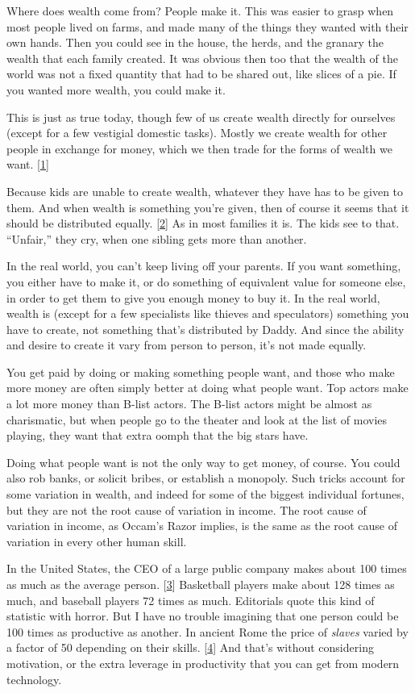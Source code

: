 Where does wealth come from? People make it. This was easier to grasp
when most people lived on farms, and made many of the things they wanted
with their own hands. Then you could see in the house, the herds, and
the granary the wealth that each family created. It was obvious then too
that the wealth of the world was not a fixed quantity that had to be
shared out, like slices of a pie. If you wanted more wealth, you could
make it.

This is just as true today, though few of us create wealth directly for
ourselves (except for a few vestigial domestic tasks). Mostly we create
wealth for other people in exchange for money, which we then trade for
the forms of wealth we want. {[}\hyperref[f1n]{1}{]}

Because kids are unable to create wealth, whatever they have has to be
given to them. And when wealth is something you're given, then of course
it seems that it should be distributed equally. {[}\hyperref[f2n]{2}{]}
As in most families it is. The kids see to that. ``Unfair,'' they cry,
when one sibling gets more than another.

In the real world, you can't keep living off your parents. If you want
something, you either have to make it, or do something of equivalent
value for someone else, in order to get them to give you enough money to
buy it. In the real world, wealth is (except for a few specialists like
thieves and speculators) something you have to create, not something
that's distributed by Daddy. And since the ability and desire to create
it vary from person to person, it's not made equally.

You get paid by doing or making something people want, and those who
make more money are often simply better at doing what people want. Top
actors make a lot more money than B-list actors. The B-list actors might
be almost as charismatic, but when people go to the theater and look at
the list of movies playing, they want that extra oomph that the big
stars have.

Doing what people want is not the only way to get money, of course. You
could also rob banks, or solicit bribes, or establish a monopoly. Such
tricks account for some variation in wealth, and indeed for some of the
biggest individual fortunes, but they are not the root cause of
variation in income. The root cause of variation in income, as Occam's
Razor implies, is the same as the root cause of variation in every other
human skill.

In the United States, the CEO of a large public company makes about 100
times as much as the average person. {[}\hyperref[f3n]{3}{]} Basketball
players make about 128 times as much, and baseball players 72 times as
much. Editorials quote this kind of statistic with horror. But I have no
trouble imagining that one person could be 100 times as productive as
another. In ancient Rome the price of \emph{slaves} varied by a factor
of 50 depending on their skills. {[}\hyperref[f4n]{4}{]} And that's
without considering motivation, or the extra leverage in productivity
that you can get from modern technology.

